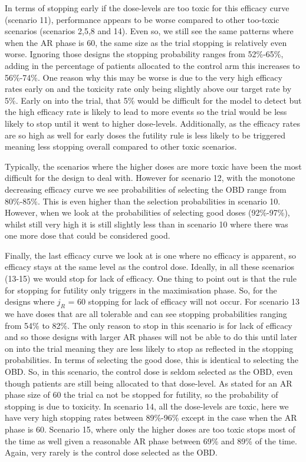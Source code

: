 In terms of stopping early if the dose-levels are too toxic for this efficacy curve (scenario 11), performance appears to be worse compared to other too-toxic scenarios (scenarios 2,5,8 and 14). Even so, we still see the same patterns where when the AR phase is 60, the same size as the trial stopping is relatively even worse. Ignoring those designs the stopping probability ranges from 52\%-65\%, adding in the percentage of patients allocated to the control arm this increases to 56\%-74\%. One reason why this may be worse is due to the very high efficacy rates early on and the toxicity rate only being slightly above our target rate by 5\%. Early on into the trial, that 5\% would be difficult for the model to detect but the high efficacy rate is likely to lead to more events so the trial would be less likely to stop until it went to higher dose-levels. Additionally, as the efficacy rates are so high as well for early doses the futility rule is less likely to be triggered meaning less stopping overall compared to other toxic scenarios.  

Typically, the scenarios where the higher doses are more toxic have been the most difficult for the design to deal with. However for scenario 12, with the monotone decreasing efficacy curve we see probabilities of selecting the OBD range from 80\%-85\%. This is even higher than the selection probabilities in scenario 10. However, when we look at the probabilities of selecting good doses (92\%-97\%), whilst still very high it is still slightly less than in scenario 10 where there was one more dose that could be considered good. 

Finally, the last efficacy curve we look at is one where no efficacy is apparent, so efficacy stays at the same level as the control dose. Ideally, in all these scenarios (13-15) we would stop for lack of efficacy. One thing to point out is that the rule for stopping for futility only triggers in the maximisation phase. So, for the designs where $j_R$ = 60 stopping for lack of efficacy will not occur. For scenario 13 we have doses that are all tolerable and can see stopping probabilities ranging from 54\% to 82\%. The only reason to stop in this scenario is for lack of efficacy and so those designs with larger AR phases will not be able to do this until later on into the trial meaning they are less likely to stop as reflected in the stopping probabilities. In terms of selecting the good dose, this is identical to selecting the OBD. So, in this scenario, the control dose is seldom selected as the OBD, even though patients are still being allocated to that dose-level. As stated for an AR phase size of 60 the trial ca not be stopped for futility, so the probability of stopping is due to toxicity. In scenario 14, all the dose-levels are toxic, here we have very high stopping rates between 89\%-96\% except in the case when the AR phase is 60. Scenario 15, where only the higher doses are too toxic stops most of the time as well given a reasonable AR phase between 69\% and 89\% of the time. Again, very rarely is the control dose selected as the OBD. 

